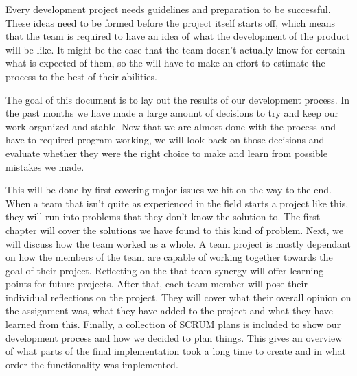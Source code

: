 Every development project needs guidelines and preparation to be successful. These ideas need to be formed before the project itself starts off, which means that the team is required to have an idea of what the development of the product will be like. It might be the case that the team doesn't actually know for certain what is expected of them, so the will have to make an effort to estimate the process to the best of their abilities.

The goal of this document is to lay out the results of our development process. In the past months we have made a large amount of decisions to try and keep our work organized and stable. Now that we are almost done with the process and have to required program working, we will look back on those decisions and evaluate whether they were the right choice to make and learn from possible mistakes we made.

This will be done by first covering major issues we hit on the way to the end. When a team that isn't quite as experienced in the field starts a project like this, they will run into problems that they don't know the solution to. The first chapter will cover the solutions we have found to this kind of problem. Next, we will discuss how the team worked as a whole. A team project is mostly dependant on how the members of the team are capable of working together towards the goal of their project. Reflecting on the that team synergy will offer learning points for future projects.
After that, each team member will pose their individual reflections on the project. They will cover what their overall opinion on the assignment was, what they have added to the project and what they have learned from this.
Finally, a collection of SCRUM plans is included to show our development process and how we decided to plan things. This gives an overview of what parts of the final implementation took a long time to create and in what order the functionality was implemented.
